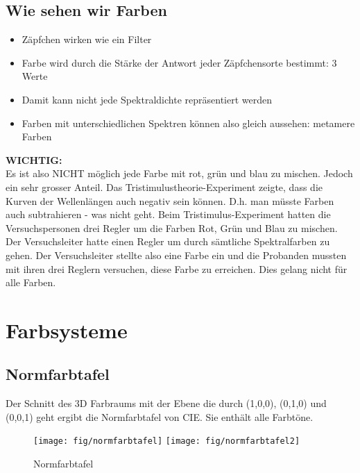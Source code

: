   
\subsection{Wie sehen wir Farben}
\begin{itemize}
    \item Zäpfchen wirken wie ein Filter
    \item Farbe wird durch die Stärke der Antwort jeder Zäpfchensorte bestimmt: 3 Werte
    \item Damit kann nicht jede Spektraldichte repräsentiert werden
    \item Farben mit unterschiedlichen Spektren können also gleich aussehen: metamere Farben
\end{itemize}
\noindent
\textbf{WICHTIG:}\\Es ist also NICHT möglich jede Farbe mit rot, grün und blau zu mischen. Jedoch ein sehr grosser Anteil.
Das Tristimulustheorie-Experiment zeigte, dass die Kurven der Wellenlängen auch negativ sein können. D.h. man müsste Farben auch subtrahieren - was nicht geht. Beim Tristimulus-Experiment hatten die Versuchspersonen drei Regler um die Farben Rot, Grün und Blau zu mischen. Der Versuchsleiter hatte einen Regler um durch sämtliche Spektralfarben zu gehen. Der Versuchsleiter stellte also eine Farbe ein und die Probanden mussten mit ihren drei Reglern versuchen, diese Farbe zu erreichen. Dies gelang nicht für alle Farben.

\clearpage
\section{Farbsysteme}
\subsection{Normfarbtafel}
Der Schnitt des 3D Farbraums mit der Ebene die durch (1,0,0), (0,1,0) und (0,0,1) geht ergibt die Normfarbtafel von CIE. Sie enthält alle Farbtöne. 
\begin{figure}[!ht]
\centering
\texttt{[image: fig/normfarbtafel]}
\texttt{[image: fig/normfarbtafel2]}
\caption{Normfarbtafel}
\label{fig:normfarbtafel}
\end{figure}

